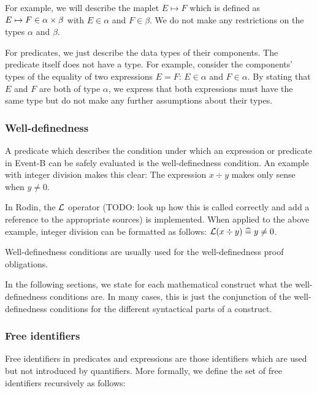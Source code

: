 For example, we will describe the maplet $E\mapsto F$ which is defined as $E\mapsto F\in\alpha\mathbin\times\beta$ with
 $E\in\alpha$ and $F\in\beta$. We do not make any restrictions on the types $\alpha$ and $\beta$.

For predicates, we just describe the data types of their components. 
The predicate itself does not have a type.
For example, consider the components' types of the equality of two expressions $E=F$: $E\in\alpha$ and $F\in\alpha$.
By stating that $E$ and $F$ are both of type $\alpha$, we express that both expressions must have the
  same type but do not make any further assumptions about their types.

\subsubsection{Well-definedness}

A predicate which describes the condition under which an expression or predicate in Event-B can be safely evaluated is the well-definedness condition.
An example with integer division makes this clear: The expression $x\div y$ makes only sense when $y\neq 0$.

In Rodin, the $\mathcal{L}$ operator (TODO: look up how this is called correctly and add a reference to the appropriate
sources) is implemented. When applied to the above example, integer division can be formatted as follows: $\mathcal{L}(x\div y) \mathrel{\widehat=} y\neq 0$.

Well-definedness conditions are usually used for the well-definedness proof obligations.

In the following sections, we state for each mathematical construct what the well-definedness conditions are.
In many cases, this is just the conjunction of the well-definedness conditions for the different syntactical parts of a construct.

\subsubsection{Free identifiers}
\label{free_identifiers}
Free identifiers in predicates and expressions are those identifiers which are used but not introduced by quantifiers.
More formally, we define the set of free identifiers \freeids{} recursively as follows:

